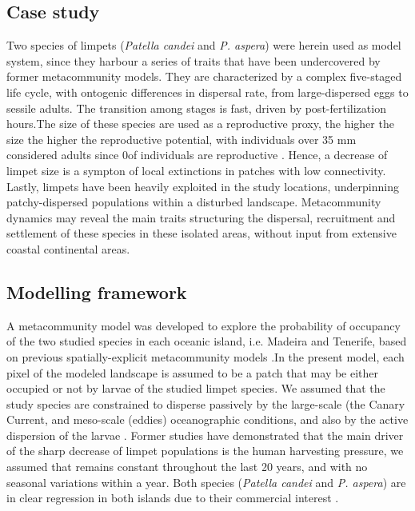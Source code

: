 \documentclass[12pt]{article}
\begin{document}
\begin{flushleft}
{{{{{\subsection{Case study}
Two species of limpets (\textit{Patella candei} and \textit{P. aspera}) were herein used as model system, since they harbour a series of traits that have been undercovered by former metacommunity models. They are characterized by a complex five-staged life cycle, with ontogenic differences in dispersal rate, from large-dispersed eggs to sessile adults. The transition among stages is fast, driven by post-fertilization hours.The size of these species are used as a reproductive proxy, the higher the size the higher the reproductive potential, with individuals over 35 mm considered adults since 0\percent of individuals are reproductive \citep{henriques2012life}. Hence, a decrease of limpet size is a sympton of local extinctions in patches with low connectivity. Lastly, limpets have been heavily exploited in the study locations, underpinning patchy-dispersed populations within a disturbed landscape. Metacommunity dynamics may reveal the main traits structuring the dispersal, recruitment and settlement of these species in these isolated areas, without input from extensive coastal continental areas.

\subsection{Modelling framework}
A metacommunity model was developed to explore the probability of occupancy of the two studied species in each oceanic island, i.e. Madeira and Tenerife, based on previous spatially-explicit metacommunity models \citep{hanski1999habitat,hanski2000metapopulation, ovaskainen2001spatially, hanski2002extinction, bertuzzo2015metapopulation}.In the present model, each pixel of the modeled landscape is assumed to be a patch that may be either occupied or not by larvae of the studied limpet species. We assumed that the study species are constrained to disperse passively by the large-scale (the Canary Current, \citep{barton1998transition} and meso-scale (eddies) oceanographic conditions, and also by the active dispersion of the larvae \citep{henriques2012life}. Former studies have demonstrated that the main driver of the sharp decrease of limpet populations is the human harvesting pressure, we assumed that remains constant throughout the last 20 years, and with no seasonal variations within a year. Both species (\textit{Patella candei} and \textit{P. aspera}) are in clear regression in both islands due to their commercial interest \citep{riera2016clear, sousa2019long}.

}}}}}
\end{flushleft}
\end{document}
